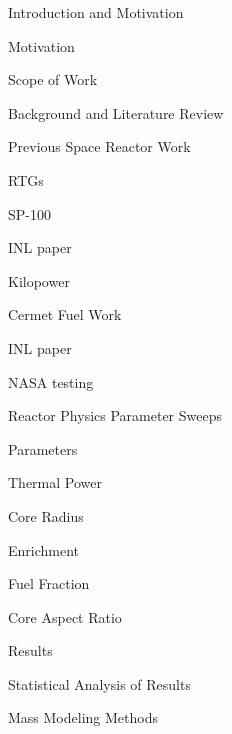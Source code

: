 \documentclass{report}
\begin{document}
\begin{outline}
  \item { Introduction and Motivation }
  \begin{outline}
    \item { Motivation } \\
    \item { Scope of Work } \\
  \end{outline}
  \item { Background and Literature Review }
      \begin{outline}
          \item { Previous Space Reactor Work }
                \begin{outline}
                \item {RTGs}
                \item {SP-100}
                \item {INL paper}
                \item {Kilopower}
                \end{outline}
           \item { Cermet Fuel Work }
                \begin{outline}
                \item {INL paper}
                \item {NASA testing}
                \end{outline}
      \end{outline}
  \item { Reactor Physics Parameter Sweeps }
      \begin{outline}
      \item {Parameters}
          \begin{outline}
          \item {Thermal Power}
          \item {Core Radius}
          \item {Enrichment}
          \item {Fuel Fraction}
          \item {Core Aspect Ratio}
          \end{outline}
      \item {Results}
      \item {Statistical Analysis of Results}
      \end{outline}
  \item { Mass Modeling Methods }
      \begin{outline}

\end{outline}
\end{outline}
\end{document}
